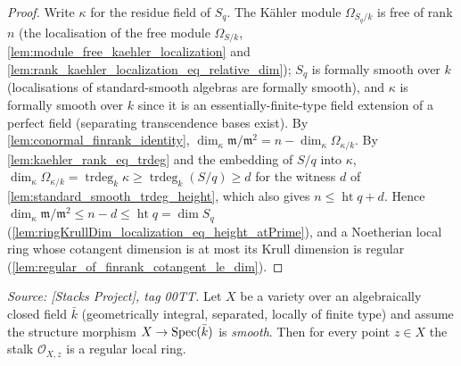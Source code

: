\begin{proof}
  \leanok
  Write \(\kappa\) for the residue field of \(S_q\). The K\"ahler module
  \(\Omega_{S_q/k}\) is free of rank \(n\) (the localisation of the free
  module \(\Omega_{S/k}\), \cref{lem:module_free_kaehler_localization} and
  \cref{lem:rank_kaehler_localization_eq_relative_dim}); \(S_q\) is formally
  smooth over \(k\) (localisations of standard-smooth algebras are formally
  smooth), and \(\kappa\) is formally smooth over \(k\) since it is an
  essentially-finite-type field extension of a perfect field (separating
  transcendence bases exist). By \cref{lem:conormal_finrank_identity},
  \(\dim_\kappa \mathfrak m/\mathfrak m^2 = n - \dim_\kappa \Omega_{\kappa/k}\).
  By \cref{lem:kaehler_rank_eq_trdeg} and the embedding of \(S/q\) into
  \(\kappa\), \(\dim_\kappa \Omega_{\kappa/k} = \operatorname{trdeg}_k \kappa
  \ge \operatorname{trdeg}_k (S/q) \ge d\) for the witness \(d\) of
  \cref{lem:standard_smooth_trdeg_height}, which also gives
  \(n \le \operatorname{ht} q + d\). Hence
  \(\dim_\kappa \mathfrak m/\mathfrak m^2 \le n - d \le \operatorname{ht} q
  = \dim S_q\) (\cref{lem:ringKrullDim_localization_eq_height_atPrime}), and a
  Noetherian local ring whose cotangent dimension is at most its Krull
  dimension is regular (\cref{lem:regular_of_finrank_cotangent_le_dim}).
\end{proof}

\begin{lemma}
  \label{lem:smooth_to_regular_local_ring}
  \textit{Source: [Stacks Project], tag 00TT.}
  Let \(X\) be a variety over an algebraically closed field \(\bar k\)
  (geometrically integral, separated, locally of finite type) and assume the
  structure morphism \(X \to \operatorname{Spec}(\bar k)\) is \emph{smooth}. Then for every
  point \(z \in X\) the stalk \(\mathcal O_{X, z}\) is a regular local ring.
\end{lemma}

